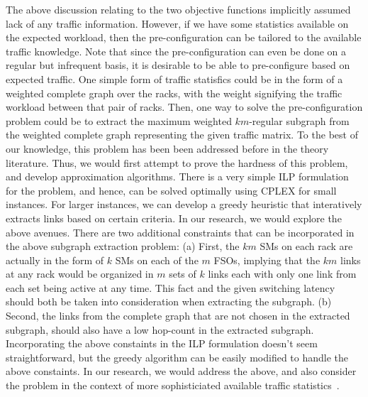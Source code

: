   The above discussion
relating to the two objective functions implicitly assumed lack of any
traffic information. However, if we have some statistics available on
the expected workload, then the pre-configuration can be tailored to
the available traffic knowledge. Note that since the pre-configuration
can even be done on a regular but infrequent basis, it is desirable to
be able to pre-configure based on expected traffic. 
%
One simple form of traffic statisfics could be in the form of a
weighted complete graph over the racks, with the weight signifying the
traffic workload between that pair of racks. Then, one way to solve
the pre-configuration problem could be to extract the maximum weighted
$km$-regular subgraph from the weighted complete graph representing
the given traffic matrix. To the best of our knowledge, this problem
has been been addressed before in the theory literature.  Thus, we
would first attempt to prove the hardness of this problem, and develop
approximation algorithms. There is a very simple ILP formulation for
the problem, and hence, can be solved optimally using CPLEX for small
instances. For larger instances, we can develop a greedy heuristic
that interatively extracts links based on certain criteria. In our
research, we would explore the above avenues.
%
There are two additional constraints that can be incorporated in the
above subgraph extraction problem: (a) First, the $km$ SMs on each
rack are actually in the form of $k$ SMs on each of the $m$ FSOs,
implying that the $km$ links at any rack would be organized in $m$
sets of $k$ links each with only one link from each set being active
at any time. This fact and the given switching latency should both be
taken into consideration when extracting the subgraph. (b) Second, the
links from the complete graph that are not chosen in the extracted
subgraph, should also have a low hop-count in the extracted subgraph.
%
Incorporating the above constaints in the ILP formulation doesn't seem
straightforward, but the greedy algorithm can be easily modified to 
handle the above constaints. 
%
In our research, we would address the above, and also consider the
problem in the context of more sophisticiated available traffic
statistics~\cite{}.


